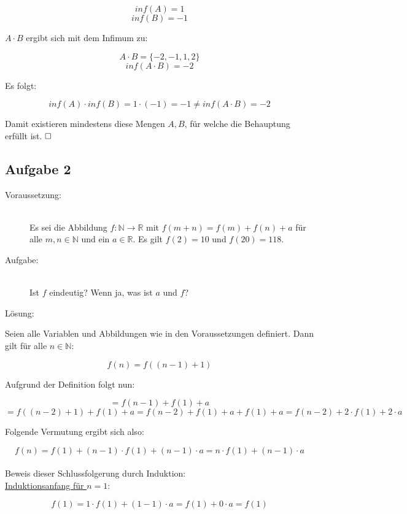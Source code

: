 \documentclass[11pt, a4paper]{article}
\begin{document}
		\[ inf(A) = 1 \]
		\[ inf(B) = -1 \]

		$A\cdot B$ ergibt sich mit dem Infimum zu:

		\[ A\cdot B = \{-2,-1,1,2 \} \]
		\[ inf(A\cdot B) = -2 \]

		Es folgt:

		\[ inf(A) \cdot inf(B) = 1\cdot (-1) = -1 \neq inf(A\cdot B) = -2 \]

		Damit existieren mindestens diese Mengen $A,B$, für welche die Behauptung erfüllt ist. $\hfill\Box$


	\newpage

	\subsection*{Aufgabe 2}

		\begin{description}
			\item[Voraussetzung:]\hfill \\
				Es sei die Abbildung $f:\mathbb{N}\longrightarrow \mathbb{R}$ mit $f(m+n)= f(m) + f(n) + a$ für alle $m,n \in \mathbb{N}$ und ein $a \in \mathbb{R}$. Es gilt $f(2) = 10$ und $f(20) = 118$. \hfill
			\item[Aufgabe:]\hfill \\
				Ist $f$ eindeutig? Wenn ja, was ist $a$ und $f$?
			\item[Lösung:]
		\end{description}

		Seien alle Variablen und Abbildungen wie in den Voraussetzungen definiert. Dann gilt für alle $n \in \mathbb{N}$:

		\[ f(n) = f((n-1)+1) \]

		Aufgrund der Definition folgt nun:

		\[ = f(n-1) + f(1) + a \]
		\[ = f((n-2)+1) + f(1) + a = f(n-2) + f(1) + a + f(1) + a = f(n-2) + 2\cdot f(1) + 2\cdot a \]

		Folgende Vermutung ergibt sich also:

		\[ f(n) = f(1) + (n-1)\cdot f(1) + (n-1)\cdot a = n\cdot f(1) + (n-1)\cdot a \] \\



		Beweis dieser Schlussfolgerung durch Induktion:\\



		\underline{Induktionsanfang für $n=1$}:

		\[ f(1) = 1\cdot f(1) + (1-1)\cdot a = f(1) + 0\cdot a = f(1) \]
\end{document}
